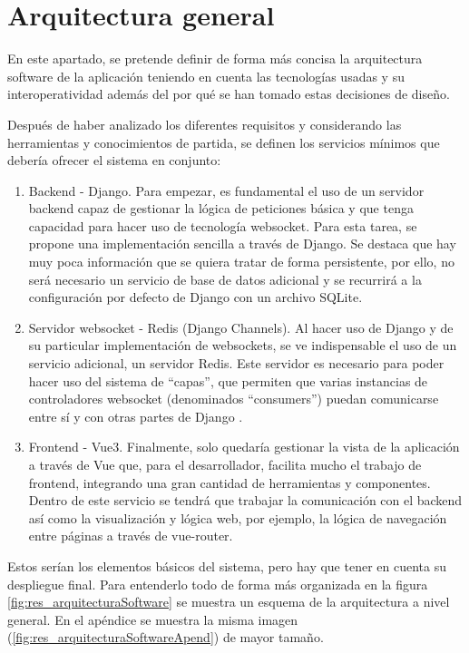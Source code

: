 \section{Arquitectura general}

En este apartado, se pretende definir de forma más concisa la arquitectura software de la aplicación
teniendo en cuenta las tecnologías usadas y su interoperatividad además del por qué se han tomado estas decisiones de diseño.

Después de haber analizado los diferentes requisitos y considerando las herramientas y conocimientos de partida,
se definen los servicios mínimos que debería ofrecer el sistema en conjunto:

\begin{enumerate}
	\item Backend - Django. Para empezar, es fundamental el uso de un servidor backend capaz de
	      gestionar la lógica de peticiones básica y que tenga capacidad para hacer uso de tecnología websocket.
	      Para esta tarea, se propone una implementación sencilla a través de Django. Se destaca que hay muy poca información que se
	      quiera tratar de forma persistente, por ello, no será necesario un servicio de base de datos adicional
	      y se recurrirá a la configuración por defecto de Django con un archivo SQLite.
	\item Servidor websocket - Redis (Django Channels). Al hacer uso de Django y de su particular implementación de
	      websockets, se ve indispensable el uso de un servicio adicional, un servidor Redis. Este servidor es necesario para
	      poder hacer uso del sistema de ``capas'', que permiten que varias instancias de controladores websocket
	      (denominados ``consumers'') puedan comunicarse entre sí y con otras partes de Django \cite{djangoChannelsLayers}.
	\item Frontend - Vue3. Finalmente, solo quedaría gestionar la vista de la aplicación a través de Vue
	      que, para el desarrollador, facilita mucho el trabajo de frontend, integrando una gran cantidad de herramientas y componentes.
	      Dentro de este servicio se tendrá que trabajar la comunicación con el backend así como la visualización y lógica
	      web, por ejemplo, la lógica de navegación entre páginas a través de vue-router.
\end{enumerate}

Estos serían los elementos básicos del sistema, pero hay que tener en cuenta su
despliegue final. Para entenderlo todo de forma más organizada en la figura \ref{fig:res_arquitecturaSoftware} se muestra un esquema de la arquitectura
a nivel general. En el apéndice se muestra la misma imagen (\ref{fig:res_arquitecturaSoftwareApend}) de mayor tamaño.

